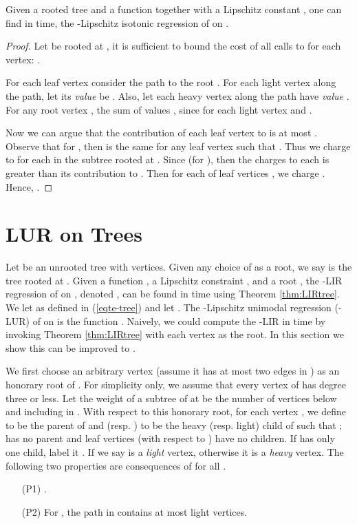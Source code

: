 \documentclass[11pt]{article}
\begin{document}
\begin{theorem}\label{thm:LIRtree}
Given a rooted tree  and a function  together with a Lipschitz constant , one can find in  time, the -Lipschitz isotonic regression of  on .
\end{theorem}
\begin{proof}
Let  be rooted at , it is sufficient to bound the cost of all calls to  for each vertex: .  

For each leaf vertex  consider the path to the root .  For each light vertex  along the path, let its \emph{value} be .  Also, let each heavy vertex  along the path have \emph{value} .  
For any root vertex , the sum of values , since  for each light vertex and .  

Now we can argue that the contribution of each leaf vertex  to  is at most .  Observe that for , then  is the same for any leaf vertex  such that .  Thus we charge  to  for each  in the subtree rooted at .  Since  (for ), then the charges to each  is greater than its contribution to .  Then for each of  leaf vertices , we charge .  Hence, .  
\end{proof}



\section{LUR on Trees}
\label{sec:treelur}

Let  be an unrooted tree with  vertices.  
Given any choice of  as a root, we say  is the tree  rooted at .  
Given a function , a Lipschitz constraint , and a root , the -LIR regression of  on , denoted , can be found in  time using Theorem \ref{thm:LIRtree}.  We let  as defined in (\ref{eqte-tree}) and let .  The -Lipschitz unimodal regression (-LUR) of  on  is the function .  
Naively, we could compute the -LIR in  time by invoking Theorem \ref{thm:LIRtree} with each vertex as the root. In this section we show this can be improved to .


We first choose an arbitrary vertex  (assume it has at most two edges in ) as an honorary root of .  For simplicity only, we assume that every vertex of  has degree three or less.  
Let the weight  of a subtree of  at  be the number of vertices below and including  in .
With respect to this honorary root, for each vertex , we define  to be the parent of  and  (resp. ) to be the heavy (resp. light) child of  such that ;  has no parent and leaf vertices (with respect to ) have no children.  
If  has only one child, label it . 
If  we say  is a \emph{light} vertex, otherwise it is a \emph{heavy} vertex.
The following two properties are consequences of  for all .
\begin{itemize}
\vspace{-.1in}
\item[(P1)] .  
\vspace{-.1in}
\item[(P2)] For , the path  in  contains at most  light vertices.
\end{itemize}
\end{document}
